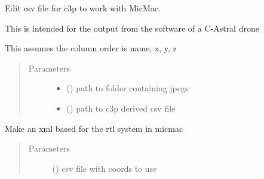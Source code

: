 \documentclass[letterpaper,10pt,english]{sphinxmanual}
\begin{document}
\begin{fulllineitems}
\label{\detokenize{pycmac:utilities.convert_c3p}}
Edit csv file for c3p to work with MicMac.

This is intended for the output from the software of a C-Astral drone

This assumes the column order is name, x, y, z
\begin{quote}\begin{description}
\item[{Parameters}] \leavevmode\begin{itemize}
\item {} 
 () \textendash{} path to folder containing jpegs

\item {} 
 () \textendash{} path to c3p derived csv file

\end{itemize}

\end{description}\end{quote}

\end{fulllineitems}


\begin{fulllineitems}
\label{\detokenize{pycmac:utilities.make_sys_utm}}
\end{fulllineitems}


\begin{fulllineitems}
\label{\detokenize{pycmac:utilities.make_xml}}
Make an xml based for the rtl system in micmac
\begin{quote}\begin{description}
\item[{Parameters}] \leavevmode
{} () \textendash{} csv file with coords to use

\end{description}\end{quote}

\end{fulllineitems}
\end{document}
